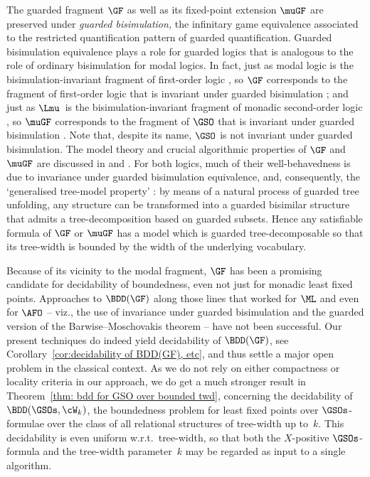 \documentclass{LMCS}
\begin{document}
\medskip
The guarded fragment $\GF$ as well as its fixed-point extension $\muGF$
are preserved under \emph{guarded bisimulation,} the infinitary game
equivalence associated to the restricted quantification pattern of
guarded quantification. Guarded bisimulation equivalence plays a role for
guarded logics that is analogous to the role of ordinary bisimulation
for modal logics. In fact, just as modal logic is
the bisimulation-invariant fragment of first-order logic \cite{Ben83},
so $\GF$ corresponds to the fragment of first-order logic
that is invariant under guarded bisimulation \cite{ABN}\?;
and just as $\Lmu$~is the bisimulation-invariant fragment
of monadic second-order logic \cite{JaninWalukiewicz},
so $\muGF$ corresponds to the fragment of $\GSO$ that is
invariant under guarded bisimulation \cite{GHO}.
Note that, despite its name, $\GSO$ is not invariant under guarded bisimulation.
The model theory and crucial algorithmic properties of $\GF$ and $\muGF$
are discussed in \cite{Graedel99} and \cite{GW}. For both logics,
much of their well-behavedness is due to invariance under
guarded bisimulation equivalence, and, consequently, the
`generalised tree-model property' \cite{Graedel99}\?:
by means of a natural process of guarded tree unfolding, any structure
can be transformed into a guarded bisimilar structure that admits a
tree-decomposition based on guarded subsets. Hence any satisfiable
formula of $\GF$ or $\muGF$ has a model which is guarded tree-decomposable
so that its tree-width is bounded by the width of the underlying vocabulary.

\medskip
Because of its vicinity to the modal fragment,
$\GF$ has been a promising candidate for
decidability of boundedness, even not just for
monadic least fixed points. Approaches to $\BDD(\GF)$
along those lines that worked for $\ML$ and even for $\AFO$
-- viz., the use of invariance under guarded bisimulation and
the guarded version of the Barwise--Moschovakis theorem --
have not been successful. Our present techniques do indeed
yield decidability of $\BDD(\GF)$,
see Corollary~\ref{cor:decidability of BDD(GF), etc},
and thus settle a major open problem in the classical
context. As we do not rely on either compactness or locality
criteria in our approach, we do get a much stronger result
in Theorem~\ref{thm: bdd for GSO over bounded twd},
concerning the decidability
of $\BDD(\GSOs,\cW_k)$, the boundedness problem for
least fixed points over $\GSOs$-formulae over the class
of all relational structures of tree-width up to~$k$.
This decidability is even uniform w.r.t.\ tree-width, so that 
both the $X$-positive $\GSOs$-formula and the tree-width 
parameter~$k$ may be regarded as input to a single algorithm.
\end{document}

